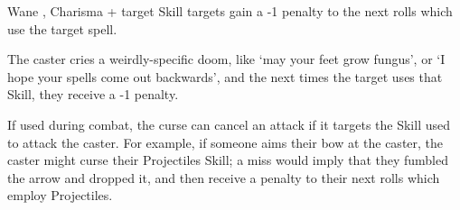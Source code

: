   {\mFate}%
  {Wane}%
  {\duplicated,\detailed}%
  {Charisma + target Skill}%
  {\spellArea{} targets gain a -1 penalty to the next  rolls which use the target spell.}%
  {The caster cries a weirdly-specific doom, like `may your feet grow fungus', or `I hope your spells come out backwards', and the next  times the target uses that Skill, they receive a -1 penalty.

  If used during combat, the curse can cancel an attack if it targets the Skill used to attack the caster.
  For example, if someone aims their bow at the caster, the caster might curse their Projectiles Skill; a miss would imply that they fumbled the arrow and dropped it, and then receive a penalty to their next  rolls which employ Projectiles.}

